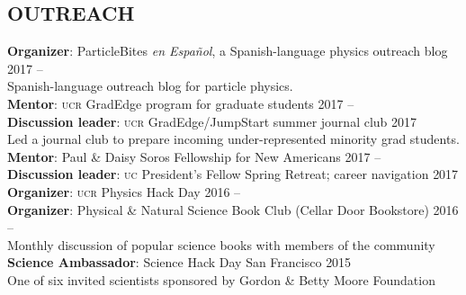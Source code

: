 \documentclass[margin,line]{resume}
\newcommand{\scap}[1]{\textsc{\MakeLowercase{#1}}}
\begin{document}
\begin{resume}

\section{\footnotesize \sc
\sffamily 
{}OUTREACH
}

\textbf{Organizer}: ParticleBites \emph{en Espa\~nol}, a Spanish-language physics outreach blog
 \hfill {2017 -- \phantom{2017}}\vspace{-.75mm}
\\
\phantom{..} {\small Spanish-language outreach blog for particle physics.}
\\
%
\textbf{Mentor}: \scap{UCR} GradEdge program for graduate students
 \hfill {2017 -- \phantom{2017}}
\\
%
\textbf{Discussion leader}: \scap{UCR} GradEdge/JumpStart summer journal club
 \hfill {2017}\vspace{-.75mm}
 \\
\phantom{..} {\small Led a journal club to prepare incoming under-represented minority grad students.}
 \\
 \textbf{Mentor}: Paul \& Daisy Soros Fellowship for New Americans
 \hfill {2017 -- \phantom{2018}}\\
%
\textbf{Discussion leader}: \scap{UC} President's Fellow Spring Retreat; career navigation
 \hfill {2017}\\
%
\textbf{Organizer}: \scap{UCR} Physics Hack Day
 \hfill {2016 -- \phantom{2017}}\\
%
\textbf{Organizer}: Physical \& Natural Science Book Club (Cellar Door Bookstore)
 \hfill {2016 -- \phantom{2016}}\vspace{-.75mm}
\\
\phantom{..} {\small Monthly discussion of popular science books with members of the community}
\\
%
\textbf{Science Ambassador}: Science Hack Day San Francisco 
\hfill {2015}\vspace{-.75mm}
\\
\phantom{..} {\small One of six invited scientists sponsored by Gordon \& Betty Moore Foundation}

\end{resume}
\end{document}
